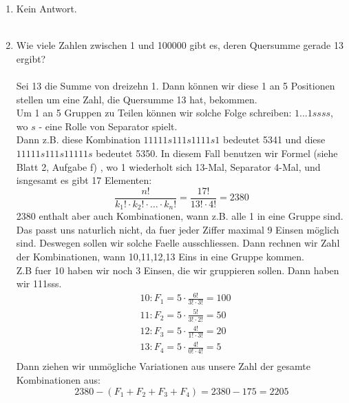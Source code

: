 \begin{enumerate}[label=(\alph*)]
        \item Kein Antwort.\\\\

        \item Wie viele Zahlen zwischen 1 und 100000 gibt es, deren Quersumme gerade 13 ergibt?\\\\
        Sei 13 die Summe von dreizehn 1. Dann k\"onnen wir diese 1 an 5 Positionen 
        stellen um eine Zahl, die Quersumme 13 hat, bekommen.\\
        Um 1 an 5 Gruppen zu Teilen k\"onnen wir solche Folge schreiben:
        $1...1 s s s s$, wo $s$ - eine Rolle von Separator spielt.\\ Dann z.B. diese
        Kombination $11111s111s1111s1$ bedeutet 5341 und diese $11111s111s11111s$
        bedeutet 5350. In diesem Fall benutzen wir Formel (siehe Blatt 2, Aufgabe f)
        , wo 1 wiederholt sich 13-Mal, Separator 4-Mal, und isngesamt es gibt 17 Elementen:
        \[\frac{n!}{k_1!\cdot k_2!\cdot\ldots\cdot k_n!} = \frac{17!}{13!\cdot4!} = 2380\]
        2380 enthalt aber auch Kombinationen, wann z.B. alle 1 in eine Gruppe sind. 
        Das passt uns naturlich nicht, da fuer jeder Ziffer maximal 9 Einsen m\"oglich sind.
        Deswegen sollen wir solche Faelle ausschliessen. Dann rechnen wir Zahl der 
        Kombinationen, wann 10,11,12,13 Eins in eine Gruppe kommen. \\
        Z.B fuer 10 haben wir noch 3 Einsen, die wir gruppieren sollen. Dann haben wir 111sss.
        \begin{align*}
        	&10: F_1 = 5 \cdot \frac{6!}{3!\cdot3!} = 100\\
        	&11: F_2 = 5 \cdot \frac{5!}{3!\cdot2!} = 50\\
        	&12: F_3 = 5 \cdot \frac{4!}{1!\cdot3!} = 20\\
        	&13: F_4 = 5 \cdot \frac{4!}{0!\cdot4!} = 5\\
        \end{align*}
        Dann ziehen wir unm\"ogliche Variationen aus unsere Zahl der gesamte Kombinationen aus:
        \[2380 - (F_1+F_2+F_3+F_4) = 2380 - 175 = 2205\]
    \end{enumerate}
